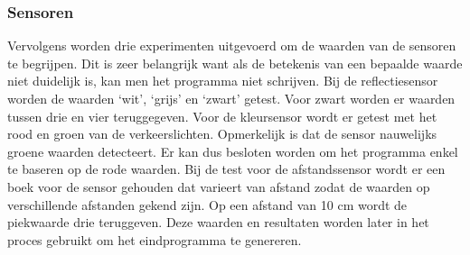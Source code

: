 \documentclass[a4paper,twoside,kulak]{kulakreport} %
\begin{document}
\subsubsection{Sensoren}

Vervolgens worden drie experimenten uitgevoerd om de waarden van de sensoren te begrijpen. Dit is zeer belangrijk want als de betekenis van een bepaalde waarde niet duidelijk is, kan men het programma niet schrijven.
Bij de reflectiesensor worden de waarden `wit', `grijs' en `zwart' getest. 
Voor zwart worden er waarden tussen drie en vier teruggegeven.  
Voor de kleursensor wordt er getest met het rood en groen van de verkeerslichten.
Opmerkelijk is dat de sensor nauwelijks groene waarden detecteert. Er kan dus besloten worden om het programma enkel te baseren op de rode waarden.
Bij de test voor de afstandssensor wordt er een boek voor de sensor gehouden dat varieert van afstand zodat de waarden op verschillende afstanden gekend zijn. Op een afstand van 10 cm wordt de piekwaarde drie teruggeven.
Deze waarden en resultaten worden later in het proces gebruikt om het eindprogramma te genereren.



\end{document}
